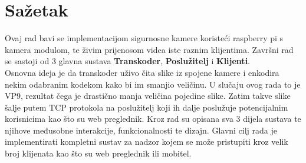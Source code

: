 \section*{Sažetak}
Ovaj rad bavi se implementacijom sigurnosne kamere koristeći raspberry pi s kamera modulom, 
te živim prijenosom videa iste raznim klijentima.
\paraBreak
Završni rad se sastoji od 3 glavna sustava \textbf{Transkoder}, \textbf{Poslužitelj} i \textbf{Klijenti}.
\\
Osnovna ideja je da transkoder uživo čita slike iz spojene kamere i enkodira nekim odabranim kodekom kako bi im smanjio veličinu. 
U slučaju ovog rada to je VP9, rezultat čega je drastično manja veličina pojedine slike. 
Zatim takve slike šalje putem TCP protokola na poslužitelj koji ih dalje poslužuje potencijalnim korisnicima kao što su web preglednik.
\paraBreak
Kroz rad su opisana sva 3 dijela sustava te njihove međusobne interakcije, funkcionalnosti te dizajn.
\paraBreak
Glavni cilj rada je implementirati kompletni sustav za nadzor kojem se može pristupiti kroz velik broj klijenata kao 
što su web preglednik ili mobitel.
